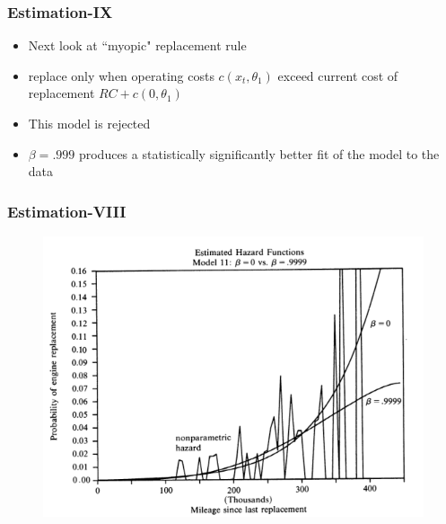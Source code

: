 \documentclass{beamer}
\begin{document}
\begin{frame}
\frametitle{Estimation-IX}
 
\begin{itemize}
\item Next look at ``myopic" replacement rule
\bigskip
\item replace only when operating costs $c(x_t,\theta_1)$ exceed current cost of replacement $RC+c(0,\theta_1)$
\bigskip
\item This model is rejected
\bigskip
\item $\beta = .999$ produces a statistically significantly better fit of the model to the data
\end{itemize}
\end{frame}

\begin{frame}
\frametitle{Estimation-VIII}
\begin{center}
\begin{figure}[h!]
\includegraphics[scale =0.5]{f3.png}
\end{figure}
\end{center}
\end{frame}
\end{document}
